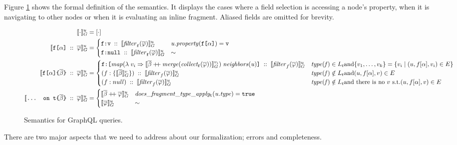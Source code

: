 Figure \ref{fig:semantics} shows the formal definition of the semantics. It displays the cases where a field selection is accessing a node's property, when it is navigating to other nodes or when it is evaluating an inline fragment. Aliased fields are omitted for brevity.

\begin{figure}
    \centering
    \begin{align} 
    \llbracket \cdot \rrbracket^{u}_{G} &= [\cdot] \\
    \llbracket \texttt{f[}\alpha\texttt{]}\; ::\; \overline{\varphi} \rrbracket^{u}_{G} &= \begin{cases}
    \texttt{f}\texttt{:}\texttt{v} \; ::\; \llbracket \mathit{filter}_{\texttt{f}}(\overline{\varphi}) \rrbracket^{u}_{G}  & \mathit{u.property}(\texttt{f[}\alpha\texttt{]}) = \texttt{v} \\
    \texttt{f}\texttt{:}\texttt{null} \; :: \; \llbracket \mathit{filter}_{\texttt{f}}(\overline{\varphi}) \rrbracket^{u}_{G} & \sim
    \end{cases}\\
    \llbracket \texttt{f[}\alpha\texttt{]} \texttt{\{}\overline{\beta}\texttt{\}} \; ::\; \overline{\varphi} \rrbracket^{u}_{G} &=
    \begin{cases}
    \texttt{f}\texttt{:}\texttt{[} \mathit{map} (\lambda\; v_{i} \Rightarrow \llbracket \overline{\beta} \mathbin{+\mkern-5mu+} \mathit{merge (collect_{\texttt{f}} (\overline{\varphi}))} \rrbracket^{v_{i}}_{G})\; \mathit{neighbors(u)} \texttt{]} \; :: \; \llbracket \mathit{filter}_{f}(\overline{\varphi}) \rrbracket^{u}_{G}  & \mathit{type(f)} \in L_{t} \text{and} \{v_{1}, \ldots, v_{k}\} = \{v_{i} \mid (u, f[\alpha], v_{i}) \in E\} \\
    (f:\{\llbracket \overline{\beta} \rrbracket^{v}_{G}\})\; :: \; \llbracket \mathit{filter}_{f}(\overline{\varphi}) \rrbracket^{u}_{G}  & \mathit{type(f)} \notin L_{t} \text{and} (u, f[\alpha], v) \in E \\
    (f:null)\; :: \; \llbracket \mathit{filter}_{f}(\overline{\varphi}) \rrbracket^{u}_{G} & \mathit{type(f)} \notin L_{t} \text{and there is no } v \text{ s.t.} (u, f[\alpha], v) \in E \\
    \end{cases}\\
    \llbracket \texttt{... on t}\texttt{\{}\overline{\beta}\texttt{\}}\; ::\; \overline{\varphi} \rrbracket^{u}_{G} &= \begin{cases}
    \llbracket \overline{\beta} \mathbin{+\mkern-5mu+} \overline{\varphi} \rrbracket^{u}_{G} & \mathit{does\_fragment\_type\_apply_{\texttt{t}}(u.type)} = \texttt{true}\\
    \llbracket \overline{\varphi} \rrbracket^{u}_{G} & \sim
    \end{cases}
    \end{align}
    \caption{Semantics for GraphQL queries.}
    \label{fig:semantics}
\end{figure}
There are two major aspects that we need to address about our formalization; errors and completeness.

